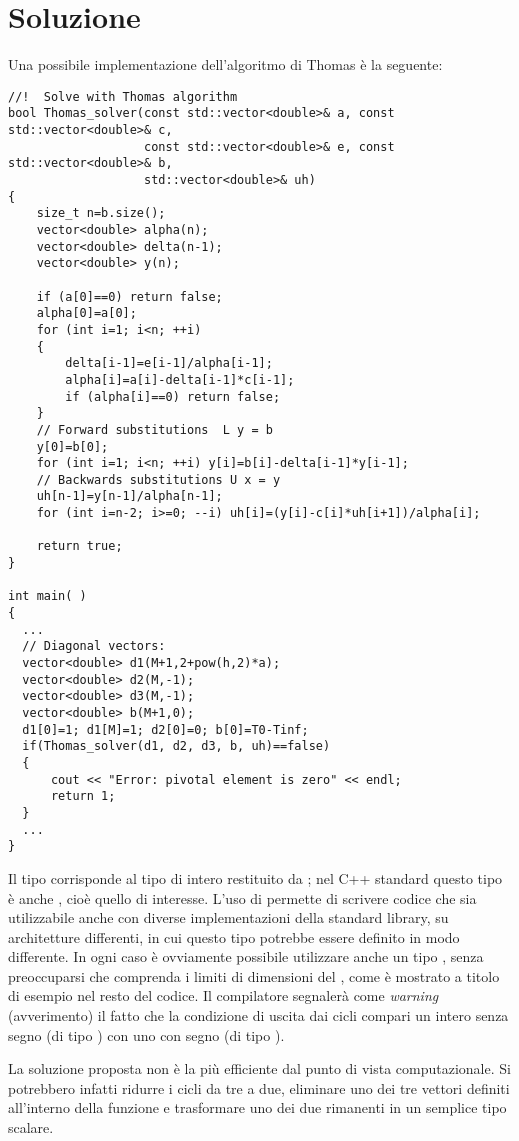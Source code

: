 \newpage
\section*{Soluzione}

Una possibile implementazione dell'algoritmo di Thomas \`e la seguente:

\lstset{basicstyle=\scriptsize\sf}
\begin{lstlisting}
//!  Solve with Thomas algorithm
bool Thomas_solver(const std::vector<double>& a, const std::vector<double>& c,
                   const std::vector<double>& e, const std::vector<double>& b,
                   std::vector<double>& uh)
{
    size_t n=b.size();
    vector<double> alpha(n);
    vector<double> delta(n-1);
    vector<double> y(n);

    if (a[0]==0) return false;
    alpha[0]=a[0];
    for (int i=1; i<n; ++i)
    {
        delta[i-1]=e[i-1]/alpha[i-1];
        alpha[i]=a[i]-delta[i-1]*c[i-1];
        if (alpha[i]==0) return false;
    }
    // Forward substitutions  L y = b
    y[0]=b[0];
    for (int i=1; i<n; ++i) y[i]=b[i]-delta[i-1]*y[i-1];
    // Backwards substitutions U x = y
    uh[n-1]=y[n-1]/alpha[n-1];
    for (int i=n-2; i>=0; --i) uh[i]=(y[i]-c[i]*uh[i+1])/alpha[i];

    return true;
}

int main( )
{
  ...
  // Diagonal vectors:
  vector<double> d1(M+1,2+pow(h,2)*a);
  vector<double> d2(M,-1);
  vector<double> d3(M,-1);
  vector<double> b(M+1,0);
  d1[0]=1; d1[M]=1; d2[0]=0; b[0]=T0-Tinf;
  if(Thomas_solver(d1, d2, d3, b, uh)==false)
  {
      cout << "Error: pivotal element is zero" << endl;
      return 1;
  }
  ...
}
\end{lstlisting}
\lstset{basicstyle=\sf}

Il tipo  corrisponde al tipo di intero restituito da ; 
nel C++ standard questo tipo \`e anche , 
cio\`e quello di interesse. L'uso di  permette di scrivere codice
che sia utilizzabile anche con diverse implementazioni della standard library, su
architetture differenti, in cui questo tipo potrebbe essere definito in modo differente.
In ogni caso \`e ovviamente possibile utilizzare anche un tipo ,
senza preoccuparsi che comprenda i limiti di dimensioni del ,
come \`e mostrato a titolo di esempio nel resto del codice. 
Il compilatore
segnaler\`a come \emph{warning} (avverimento) il fatto che la condizione di uscita 
dai cicli  compari un intero senza segno (di tipo ) con uno con segno 
(di tipo ).

La soluzione proposta non \`e la pi\`u efficiente dal punto di vista computazionale. Si potrebbero infatti ridurre i cicli  da tre a due, eliminare uno dei tre vettori definiti all'interno della funzione e trasformare uno dei due rimanenti in un semplice tipo scalare. 